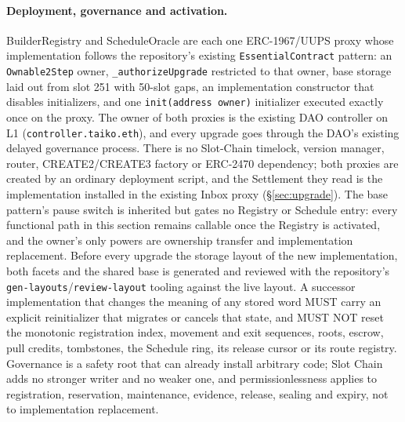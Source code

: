 \documentclass[a4paper,11pt]{article}
\newcommand{\code}[1]{\nolinkurl{#1}}
\begin{document}
\paragraph{Deployment, governance and activation.}\label{sec:registry-deployment}
BuilderRegistry and ScheduleOracle are each one ERC-1967/UUPS proxy whose
implementation follows the repository's existing \code{EssentialContract}
pattern: an \code{Ownable2Step} owner, \code{_authorizeUpgrade} restricted to
that owner, base storage laid out from slot 251 with 50-slot gaps, an
implementation constructor that disables initializers, and one
\code{init(address owner)} initializer executed exactly once on the proxy.
The owner of both proxies is the existing DAO controller on L1
(\code{controller.taiko.eth}), and every upgrade goes through the DAO's
existing delayed governance process.  There is no Slot-Chain timelock,
version manager, router, CREATE2/CREATE3 factory or ERC-2470 dependency; both
proxies are created by an ordinary deployment script, and the Settlement they
read is the implementation installed in the existing Inbox proxy
(\S\ref{sec:upgrade}).  The base pattern's pause switch is inherited but gates
no Registry or Schedule entry: every functional path in this section remains
callable once the Registry is activated, and the owner's only powers are
ownership transfer and implementation replacement.  Before every upgrade the
storage layout of the new implementation, both facets and the shared base is
generated and reviewed with the repository's
\code{gen-layouts}/\code{review-layout} tooling against the live layout.  A
successor implementation that changes the meaning of any stored word MUST
carry an explicit reinitializer that migrates or cancels that state, and MUST
NOT reset the monotonic registration index, movement and exit sequences,
roots, escrow, pull credits, tombstones, the Schedule ring, its release cursor
or its route registry.  Governance is a safety root that can already install
arbitrary code; Slot Chain adds no stronger writer and no weaker one, and
permissionlessness applies to registration, reservation, maintenance,
evidence, release, sealing and expiry, not to implementation replacement.
\end{document}
